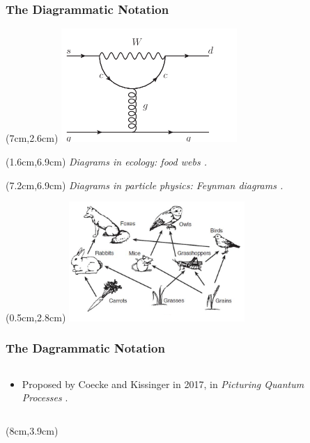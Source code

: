 \documentclass[]{beamer}
\begin{document}
\begin{frame}
	\frametitle{The Diagrammatic Notation}
		\begin{textblock*}{12cm}(7cm,2.6cm)
		\includegraphics[width=0.5\textwidth]{PenguinDiagram.png}
	\end{textblock*}
	\begin{textblock*}{6cm}(1.6cm,6.9cm)
	\tiny	\textit{Diagrams in ecology: food webs \cite{Glaser}.}
	\end{textblock*}
	\begin{textblock*}{6cm}(7.2cm,6.9cm)
		\tiny	\textit{Diagrams in particle physics: Feynman diagrams \cite{Vos}.}
	\end{textblock*}
		\begin{textblock*}{12cm}(0.5cm,2.8cm)
		\includegraphics[width=0.5\textwidth]{FoodWeb.png}
	\end{textblock*}
\end{frame}

\begin{frame}
	\frametitle{The Dagrammatic Notation}
	\begin{columns}
		\begin{column}{0.5\textwidth}
			\begin{itemize}
			\item Proposed by Coecke and Kissinger in 2017, in \textit{Picturing Quantum Processes} \cite{Coecke2017}. 
			\end{itemize}
		\end{column}
		\begin{column}{0.5\textwidth}
			
		\end{column}
	\end{columns}
	 \begin{textblock*}{6cm}(8cm,3.9cm)
	 \end{textblock*}
\end{frame}
\end{document}
